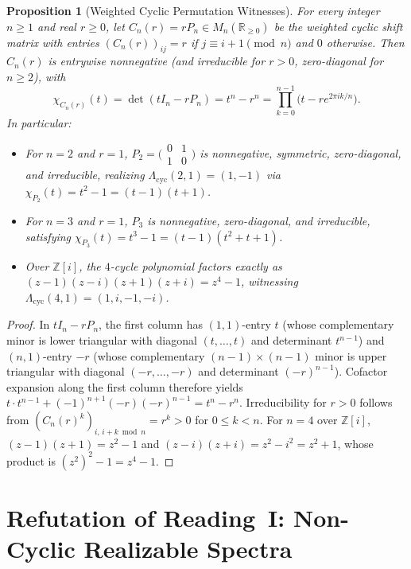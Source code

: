 \documentclass[11pt]{article}
\newtheorem{proposition}[theorem]{Proposition}
\theoremstyle{definition}
\theoremstyle{remark}
\begin{document}
\begin{proposition}[Weighted Cyclic Permutation Witnesses]\label{prop:positive}
For every integer $n \ge 1$ and real $r \ge 0$, let $C_n(r) = r P_n \in
M_n(\mathbb{R}_{\ge 0})$ be the weighted cyclic shift matrix with entries
$(C_n(r))_{ij} = r$ if $j \equiv i + 1 \pmod{n}$ and $0$ otherwise. Then $C_n(r)$ is
entrywise nonnegative (and irreducible for $r > 0$, zero-diagonal for $n \ge 2$), with
\[
  \chi_{C_n(r)}(t) = \det(t I_n - r P_n) = t^n - r^n
  = \prod_{k=0}^{n-1} \bigl(t - r e^{2\pi i k / n}\bigr).
\]
In particular:
\begin{itemize}
  \item For $n = 2$ and $r = 1$, $P_2 = \bigl(\begin{smallmatrix} 0 & 1 \\ 1 & 0
    \end{smallmatrix}\bigr)$ is nonnegative, symmetric, zero-diagonal, and irreducible,
    realizing $\Lambda_{\mathrm{cyc}}(2, 1) = (1, -1)$ via $\chi_{P_2}(t) = t^2 - 1 =
    (t - 1)(t + 1)$.
  \item For $n = 3$ and $r = 1$, $P_3$ is nonnegative, zero-diagonal, and irreducible,
    satisfying $\chi_{P_3}(t) = t^3 - 1 = (t - 1)(t^2 + t + 1)$.
  \item Over $\mathbb{Z}[i]$, the $4$-cycle polynomial factors exactly as
    $(z - 1)(z - i)(z + 1)(z + i) = z^4 - 1$, witnessing $\Lambda_{\mathrm{cyc}}(4, 1) =
    (1, i, -1, -i)$.
\end{itemize}
\end{proposition}

\begin{proof}
In $tI_n - rP_n$, the first column has $(1,1)$-entry $t$ (whose complementary minor is
lower triangular with diagonal $(t, \dots, t)$ and determinant $t^{n-1}$) and $(n,1)$-entry
$-r$ (whose complementary $(n-1) \times (n-1)$ minor is upper triangular with diagonal
$(-r, \dots, -r)$ and determinant $(-r)^{n-1}$). Cofactor expansion along the first column
therefore yields $t \cdot t^{n-1} + (-1)^{n+1}(-r)(-r)^{n-1} = t^n - r^n$. Irreducibility
for $r > 0$ follows from $(C_n(r)^k)_{i, \, i+k \bmod n} = r^k > 0$ for $0 \le k < n$. For
$n = 4$ over $\mathbb{Z}[i]$, $(z - 1)(z + 1) = z^2 - 1$ and $(z - i)(z + i) = z^2 - i^2 =
z^2 + 1$, whose product is $(z^2)^2 - 1 = z^4 - 1$.
\end{proof}

\section{Refutation of Reading~I: Non-Cyclic Realizable Spectra}
\end{document}
